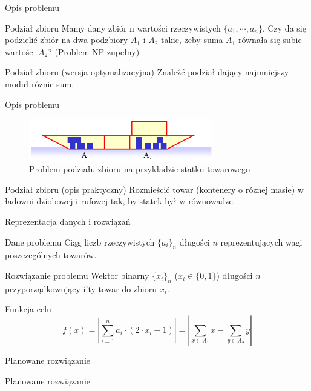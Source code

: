 \begin{frame}{Opis problemu}
    \begin{block}{Podział zbioru}
        Mamy dany zbiór n wartości rzeczywistych $\{a_1, \cdots, a_n\}$. Czy da się podzielić zbiór na dwa podzbiory $A_1$ i $A_2$ takie, żeby suma $A_1$ równała się subie wartości $A_2$? (Problem NP-zupełny)
    \end{block}

    \begin{block}{Podział zbioru (wersja optymalizacyjna)}
        Znaleźć podział dający najmniejszy moduł róznic sum.    
    \end{block}

\end{frame}

\begin{frame}{Opis problemu}
    \begin{figure}
        \centering
        \includegraphics[width=8cm]{obrazki/statek.png}
        \caption{Problem podziału zbioru na przykładzie statku towarowego}
    \end{figure}
    \begin{block}{Podział zbioru (opis praktyczny)}
        Rozmieścić towar (kontenery o róznej masie) w ładowni dziobowej i rufowej tak, by statek był w równowadze.
    \end{block}
\end{frame}

\begin{frame}{Reprezentacja danych i rozwiązań}
    \begin{block}{Dane problemu}
        Ciąg liczb rzeczywistych $\{a_i\}_n$ długości $n$ reprezentujących wagi poszczególnych towarów.
    \end{block}

    \begin{block}{Rozwiązanie problemu}
        Wektor binarny $\{x_i\}_n$ ($x_i \in \{0, 1\}$) długości $n$ przyporządkowujący i'ty towar do zbioru $x_i$.
    \end{block}

    \begin{block}{Funkcja celu}
        \begin{equation}
            f(x) = \left| \sum\limits_{i=1}^{n} a_i \cdot (2 \cdot x_i - 1) \right| = \left| \sum\limits_{x \in A_1} x - \sum\limits_{y \in A_2} y \right|
        \end{equation}
    \end{block}
\end{frame}

\begin{frame}{Planowane rozwiązanie}
    \begin{block}{Planowane rozwiązanie}
 
    \end{block}
\end{frame}
